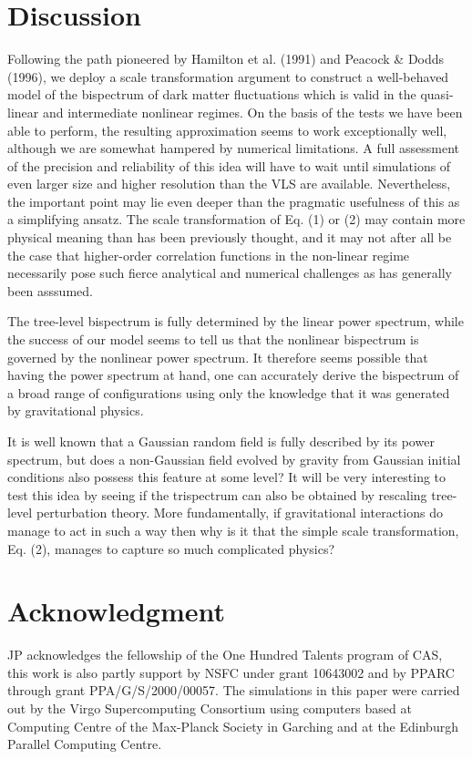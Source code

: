 \documentclass[]{mn2e}
\begin{document}
\section{Discussion}
Following the path pioneered by Hamilton et al. (1991) and Peacock
\& Dodds (1996), we deploy a scale transformation argument to
construct a well-behaved model of the bispectrum of dark matter
fluctuations which is valid in the quasi-linear and intermediate
nonlinear regimes. On the basis of the tests we have been able to
perform, the resulting approximation seems to work exceptionally
well, although we are somewhat hampered by numerical limitations. A
full assessment of the precision and reliability of this idea will
have to wait until simulations of even larger size and higher
resolution than the VLS are available.  Nevertheless, the important
point may lie even deeper than the pragmatic usefulness of this as a
simplifying ansatz. The scale transformation of Eq. (1) or (2) may
contain more physical meaning than has been previously thought, and
it may not after all be the case that higher-order correlation
functions in the non-linear regime necessarily pose such fierce
analytical and numerical challenges as has generally been asssumed.

The tree-level bispectrum is fully determined by the linear power
spectrum, while the success of our model seems to tell us that the
nonlinear bispectrum is governed by the nonlinear power spectrum. It
therefore seems possible that having the power spectrum at hand, one
can accurately derive the bispectrum of a broad range of
configurations using only the knowledge that it was generated by
gravitational physics.

It is well known that a Gaussian random field is fully described by
its power spectrum, but does a non-Gaussian field evolved by gravity
from Gaussian initial conditions also possess this feature at some
level? It will be very interesting to test this idea by seeing if
the trispectrum can also be obtained by rescaling  tree-level
perturbation theory. More fundamentally, if gravitational
interactions do manage to act in such a way then why is it that the
simple scale transformation, Eq. (2), manages to capture so much
complicated physics?

\section*{Acknowledgment}
JP acknowledges the fellowship of the One Hundred Talents program of
CAS, this work is also partly support by NSFC under grant 10643002
and by PPARC through grant PPA/G/S/2000/00057. The simulations in
this paper were carried out by the Virgo Supercomputing Consortium
using computers based at Computing Centre of the Max-Planck Society
in Garching and at the Edinburgh Parallel Computing Centre.
\end{document}
